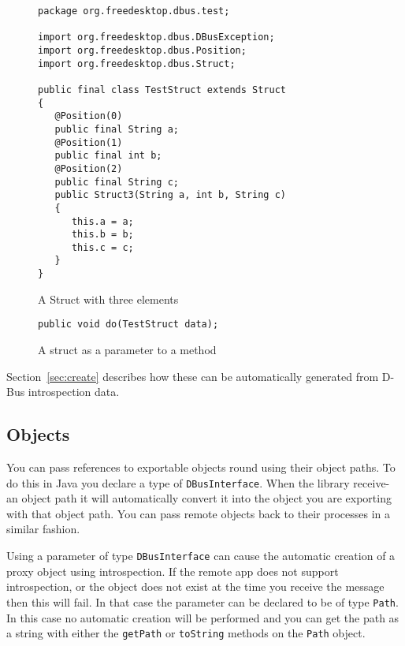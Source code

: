 \documentclass[a4paper,12pt]{article}
\begin{document}
\begin{figure}[htb]
\begin{center}
\begin{verbatim}
package org.freedesktop.dbus.test;

import org.freedesktop.dbus.DBusException;
import org.freedesktop.dbus.Position;
import org.freedesktop.dbus.Struct;

public final class TestStruct extends Struct
{
   @Position(0)
   public final String a;
   @Position(1)
   public final int b;
   @Position(2)
   public final String c;
   public Struct3(String a, int b, String c)
   {
      this.a = a;
      this.b = b;
      this.c = c;
   }
}
\end{verbatim}
\end{center}
\caption{A Struct with three elements}
\label{fig:struct}
\end{figure}

\begin{figure}[htb]
\begin{center}
\begin{verbatim}
public void do(TestStruct data);
\end{verbatim}
\end{center}
\caption{A struct as a parameter to a method}
\label{fig:structmethod}
\end{figure}


Section~\ref{sec:create} describes how these can be automatically
generated from D-Bus introspection data.

\subsection{Objects}

You can pass references to exportable objects round using their object paths.
To do this in Java you declare a type of {\tt DBusInterface}. When the library
receive- an object path it will automatically convert it into the object you
are exporting with that object path. You can pass remote objects back to their
processes in a similar fashion.

Using a parameter of type {\tt DBusInterface} can cause the automatic creation
of a proxy object using introspection. If the remote app does not support
introspection, or the object does not exist at the time you receive the message
then this will fail. In that case the parameter can be declared to be of type
{\tt Path}. In this case no automatic creation will be performed and you can
get the path as a string with either the {\tt getPath} or {\tt toString} methods
on the {\tt Path} object.
\end{document}
